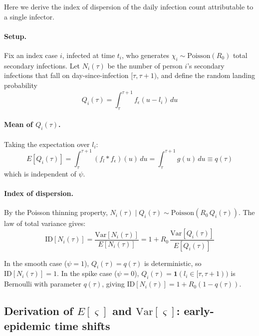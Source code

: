 \documentclass[10pt]{article}
\begin{document}
Here we derive the index of dispersion of the daily infection count attributable to a single infector.

\paragraph{Setup.}
Fix an index case $i$, infected at time $t_i$, who generates $\chi_i \sim \text{Poisson}(R_0)$ total secondary infections. Let $N_i(\tau)$ be the number of person $i$'s secondary infections that fall on day-since-infection $[\tau, \tau+1)$, and define the random landing probability
\begin{equation}
	Q_i(\tau) = \int_\tau^{\tau+1} f_\epsilon(u - l_i) \, du
\end{equation}

\paragraph{Mean of $Q_i(\tau)$.}
Taking the expectation over $l_i$:
\begin{equation}
	E[Q_i(\tau)] = \int_\tau^{\tau+1} (f_l * f_\epsilon)(u) \, du = \int_\tau^{\tau+1} g(u) \, du \equiv q(\tau)
\end{equation}
which is independent of $\psi$.

\paragraph{Index of dispersion.}
By the Poisson thinning property, $N_i(\tau) \mid Q_i(\tau) \sim \text{Poisson}(R_0 \, Q_i(\tau))$. The law of total variance gives:
\begin{equation}
	\text{ID}[N_i(\tau)] = \frac{\text{Var}[N_i(\tau)]}{E[N_i(\tau)]} = 1 + R_0 \, \frac{\text{Var}[Q_i(\tau)]}{E[Q_i(\tau)]}
\end{equation}

In the smooth case ($\psi = 1$), $Q_i(\tau) = q(\tau)$ is deterministic, so $\text{ID}[N_i(\tau)] = 1$. In the spike case ($\psi = 0$), $Q_i(\tau) = \mathbf{1}(l_i \in [\tau, \tau+1))$ is Bernoulli with parameter $q(\tau)$, giving $\text{ID}[N_i(\tau)] = 1 + R_0(1 - q(\tau))$.


\subsection{Derivation of $E[\varsigma]$ and $\text{Var}[\varsigma]$: early-epidemic time shifts}
\label{sec:supp_timeshift}
\end{document}
